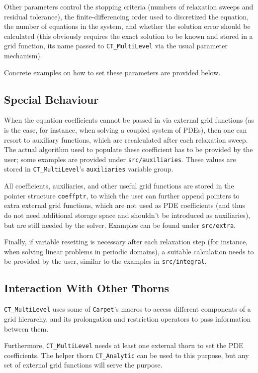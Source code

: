 Other parameters control the stopping criteria (numbers of 
relaxation sweeps and residual tolerance), the finite-differencing 
order used to discretized the equation, the number of equations
in the system, and whether the solution error should be calculated
(this obviously requires the exact solution to be known and
stored in a grid function, its name passed to \texttt{CT\_MultiLevel}
via the usual parameter mechanism).

Concrete examples on how to set these parameters are provided
below.

\subsection{Special Behaviour}
When the equation coefficients cannot be passed in via external
grid functions (as is the case, for instance, when solving a
coupled system of PDEs), then one can resort to auxiliary functions,
which are recalculated after each relaxation sweep. The actual
algorithm used to populate these coefficient has to be provided
by the user; some examples are provided under \texttt{src/auxiliaries}.
These values are stored in \texttt{CT\_MultiLevel}'s \texttt{auxiliaries}
variable group.

All coefficients, auxiliaries, and other useful grid functions are
stored in the pointer structure \texttt{coeffptr}, to which the user
can further append pointers to extra external grid functions, which 
are not used as PDE coefficients (and thus do not need additional 
storage space and shouldn't be introduced as auxiliaries), but are 
still needed by the solver. Examples can be found under 
\texttt{src/extra}.
 
Finally, if variable resetting is necessary after each relaxation
step (for instance, when solving linear problems in periodic domains),
a suitable calculation needs to be provided by the user, similar to
the examples in \texttt{src/integral}.

\subsection{Interaction With Other Thorns}
\texttt{CT\_MultiLevel} uses some of \texttt{Carpet}'s macros to
access different components of a grid hierarchy, and its prolongation
and restriction operators to pass information between them.

Furthermore, \texttt{CT\_MultiLevel} needs at least one external
thorn to set the PDE coefficients. The helper thorn \texttt{CT\_Analytic}
can be used to this purpose, but any set of external grid functions 
will serve the purpose.

